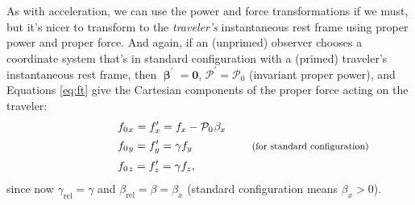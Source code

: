 \documentclass[12pt]{article}
\renewcommand{\vv}[1]{\mathbf{#1}}
\newcommand{\vvbeta}{\bm{\upbeta}}
\begin{document}
As with acceleration, we can use the power and force transformations if we must, but it's nicer to transform to the \emph{traveler's} instantaneous rest frame using proper power and proper force. And again, if an (unprimed) observer chooses a coordinate system that's in standard configuration with a (primed) traveler's instantaneous rest frame, then $\vvbeta^\prime = \vv 0$, $\mathcal{P}^\prime = \mathcal{P}_0$ (invariant proper power), and Equations \ref{eq:ft} give the Cartesian components of the proper force acting on the traveler:
\begin{equation}\label{eq:pf}
\begin{aligned}
\qquad \qquad \qquad & f_{0 \mkern1.5mu x} = f_x^\prime = f_x - \mathcal{P}_0 \mkern1mu \beta_x \\[2pt]
& f_{0 \mkern1.5mu y} = f_y^\prime = \gamma f_y \qquad \qquad \quad \textrm{\footnotesize{ (for standard configuration)}} \\[2pt]
& f_{0 \mkern1.5mu z} = f_z^\prime = \gamma f_z ,
\end{aligned}
\end{equation}
since now $\gamma_{\textrm{rel}} = \gamma$ and $\beta_{\textrm{rel}} = \beta = \beta_x$ (standard configuration means $\beta_x > 0$).
\end{document}
